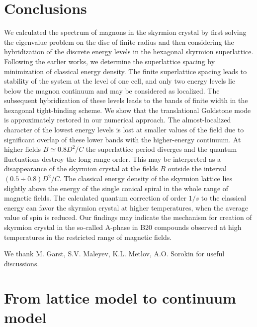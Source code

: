 \documentclass[aps,prb,twocolumn,superscriptaddress,nobalancelastpage]{revtex4-1}
\begin{document}
 \section{Conclusions
 \label{sec:conclusions}}

We calculated the spectrum of magnons in the skyrmion crystal by first solving the eigenvalue problem on the disc of finite radius and then considering the hybridization of the discrete energy levels in the hexagonal skyrmion superlattice. Following the earlier works, we determine the superlattice spacing by minimization of classical energy density.   The finite  superlattice spacing leads to stability of the system at the level of one cell, and only two energy levels lie below the magnon continuum and may be considered as localized.  The subsequent hybridization of these levels leads to the bands of finite width in the hexagonal tight-binding scheme. We show that the translational Goldstone mode is approximately restored in our numerical approach. The almost-localized character of the lowest energy levels is lost at smaller values of the field due to significant overlap of these lower bands with the higher-energy continuum. At higher fields $B\simeq 0.8 D^{2}/C$ the superlattice period diverges and the quantum fluctuations destroy the long-range order. This may be interpreted as a disappearance of the skyrmion crystal  at the fields $B$ outside the interval $(0.5 \div 0.8)  D^{2}/C$. The classical energy density of the skyrmion lattice lies slightly above the energy of the single conical spiral in the whole range of magnetic fields.  The calculated quantum correction  of order $1/s$ to the classical energy can favor the skyrmion crystal at higher temperatures, when the average value of spin is reduced.  Our findings may indicate the mechanism for creation of skyrmion crystal in the so-called A-phase in B20 compounds observed at high temperatures in the restricted range of magnetic fields. \cite{Muhlbauer2009}

 \acknowledgements

We thank  M. Garst,  S.V. Maleyev, K.L. Metlov,  A.O. Sorokin  for useful discussions. 
 

\appendix
\section{\label{app:discrete} From lattice model to continuum model  }
\end{document}
